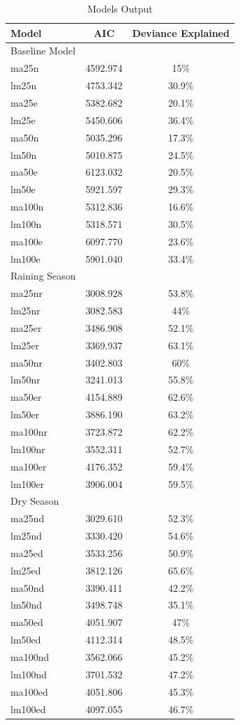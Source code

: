 \begin{table}[H]
\footnotesize
\caption{Models Output}
\begin{tabularx}{0.8\linewidth}{l c c}
\hline
\hline
Model  & AIC &   Deviance Explained\\
\hline
Baseline Model & & \\
\hline
ma25n & 4592.974 & 15\%\\
lm25n & 4753.342 & 30.9\%\\
ma25e & 5382.682 & 20.1\%\\
lm25e & 5450.606 & 36.4\%\\
ma50n & 5035.296 & 17.3\%\\
lm50n & 5010.875 & 24.5\%\\
ma50e & 6123.032 & 20.5\%\\
lm50e & 5921.597 & 29.3\% \\
ma100n & 5312.836 & 16.6\%\\
lm100n & 5318.571 & 30.5\%\\
ma100e & 6097.770 & 23.6\%\\
lm100e & 5901.040 & 33.4\%\\
\hline
Raining Season &    &\\
\hline
ma25nr & 3008.928 & 53.8\% \\
lm25nr & 3082.583 & 44\% \\
ma25er & 3486.908 & 52.1\% \\
lm25er & 3369.937 & 63.1\%\\
ma50nr & 3402.803 & 60\%\\
lm50nr & 3241.013 & 55.8\% \\
ma50er & 4154.889 & 62.6\%\\
lm50er & 3886.190 & 63.2\%\\
ma100nr & 3723.872 & 62.2\%\\
lm100nr & 3552.311 & 52.7\% \\
ma100er & 4176.352 & 59.4\% \\
lm100er & 3906.004 & 59.5\% \\
\hline
Dry Season&    &\\
\hline
ma25nd & 3029.610 & 52.3\% \\
lm25nd & 3330.420 & 54.6\% \\
ma25ed & 3533.256 & 50.9\%\\
lm25ed & 3812.126 & 65.6\%\\
ma50nd & 3390.411 & 42.2\%\\
lm50nd & 3498.748 & 35.1\%\\
ma50ed & 4051.907 & 47\%\\
lm50ed & 4112.314 & 48.5\%\\
ma100nd & 3562.066 & 45.2\%\\
lm100nd & 3701.532 & 47.2\%\\
ma100ed & 4051.806 & 45.3\% \\
lm100ed & 4097.055 & 46.7\% \\
\hline
\hline
\end{tabularx}
\label{results1}
\end{table}


